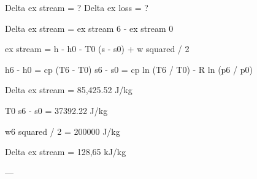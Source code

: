 Delta ex stream = ?  
Delta ex loss = ?  

Delta ex stream = ex stream 6 - ex stream 0  

ex stream = h - h0 - T0 (s - s0) + w squared / 2  

h6 - h0 = cp (T6 - T0)  
s6 - s0 = cp ln (T6 / T0) - R ln (p6 / p0)  

Delta ex stream = 85,425.52 J/kg  

T0 s6 - s0 = 37392.22 J/kg  

w6 squared / 2 = 200000 J/kg  

Delta ex stream = 128,65 kJ/kg  

---